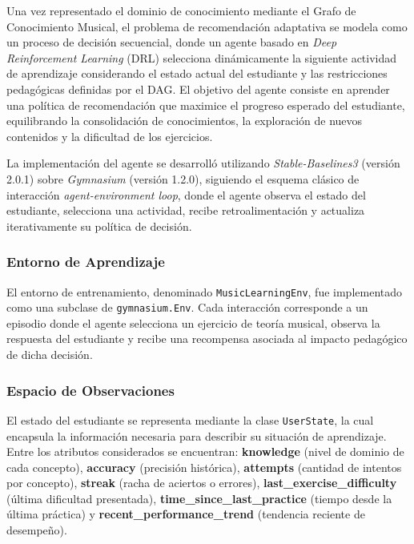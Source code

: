 Una vez representado el dominio de conocimiento mediante el Grafo de Conocimiento Musical, el problema de recomendación adaptativa se modela como un proceso de decisión secuencial, donde un agente basado en \textit{Deep Reinforcement Learning} (DRL) selecciona dinámicamente la siguiente actividad de aprendizaje considerando el estado actual del estudiante y las restricciones pedagógicas definidas por el DAG. El objetivo del agente consiste en aprender una política de recomendación que maximice el progreso esperado del estudiante, equilibrando la consolidación de conocimientos, la exploración de nuevos contenidos y la dificultad de los ejercicios.

La implementación del agente se desarrolló utilizando \textit{Stable-Baselines3} (versión 2.0.1) sobre \textit{Gymnasium} (versión 1.2.0), siguiendo el esquema clásico de interacción \textit{agent-environment loop}, donde el agente observa el estado del estudiante, selecciona una actividad, recibe retroalimentación y actualiza iterativamente su política de decisión.

\subsubsection{Entorno de Aprendizaje}

El entorno de entrenamiento, denominado \texttt{MusicLearningEnv}, fue implementado como una subclase de \texttt{gymnasium.Env}. Cada interacción corresponde a un episodio donde el agente selecciona un ejercicio de teoría musical, observa la respuesta del estudiante y recibe una recompensa asociada al impacto pedagógico de dicha decisión.

\subsubsection{Espacio de Observaciones}

El estado del estudiante se representa mediante la clase \texttt{UserState}, la cual encapsula la información necesaria para describir su situación de aprendizaje. Entre los atributos considerados se encuentran: \textbf{knowledge} (nivel de dominio de cada concepto), \textbf{accuracy} (precisión histórica), \textbf{attempts} (cantidad de intentos por concepto), \textbf{streak} (racha de aciertos o errores), \textbf{last\_exercise\_difficulty} (última dificultad presentada), \textbf{time\_since\_last\_practice} (tiempo desde la última práctica) y \textbf{recent\_performance\_trend} (tendencia reciente de desempeño).

